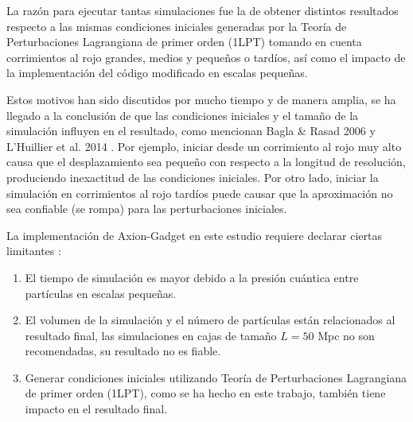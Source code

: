 \documentclass[a4paper,openright,12pt]{book}
\begin{document}
\begin{table}[]
\begin{tabular}{lccccl}
\end{tabular}
\end{table}

La razón para ejecutar tantas simulaciones fue la de obtener distintos resultados respecto a las mismas condiciones iniciales generadas por la Teoría de Perturbaciones Lagrangiana de primer orden (1LPT) tomando en cuenta corrimientos al rojo grandes, medios y pequeños o tardíos, así como el impacto de la implementación del código modificado en escalas pequeñas.

Estos motivos han sido discutidos por mucho tiempo y de manera amplia, se ha llegado a la conclusión de que las condiciones iniciales y el tamaño de la simulación influyen en el resultado, como mencionan Bagla \& Rasad 2006 \cite{4.3.3} y L'Huillier et al. 2014 \cite{4.3.4}. Por ejemplo, iniciar desde un corrimiento al rojo muy alto causa que el desplazamiento sea pequeño con respecto a la longitud de resolución, produciendo inexactitud de las condiciones iniciales. Por otro lado, iniciar la simulación en corrimientos al rojo tardíos puede causar que la aproximación no sea confiable (se rompa) para las perturbaciones iniciales.

La implementación de Axion-Gadget en este estudio requiere declarar ciertas limitantes \cite{4.3.5}:
\begin{enumerate}
\item El tiempo de simulación es mayor debido a la presión cuántica entre partículas en escalas pequeñas.
\item El volumen de la simulación y el número de partículas están relacionados al resultado final, las simulaciones en cajas de tamaño $L = 50$ Mpc no son recomendadas, su resultado no es fiable.
\item Generar condiciones iniciales utilizando Teoría de Perturbaciones Lagrangiana de primer orden (1LPT), como se ha hecho en este trabajo, también tiene impacto en el resultado final.
\end{enumerate}
\end{document}
